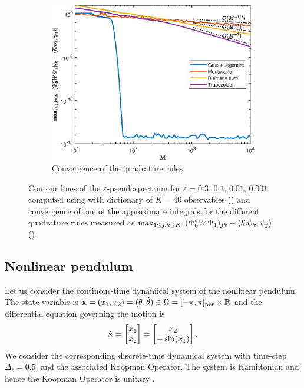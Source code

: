 \begin{figure}[h]
{\begin{subfigure}{0.45\textwidth}
        \includegraphics[width=\linewidth]{../code/figures/gauss_map/Galerkin_convergence.eps}
        \caption{Convergence of the quadrature rules}
        \label{gauss_convergence}
    \end{subfigure}\hspace*{\fill}
    }
    \caption{Contour lines of the $\varepsilon$-pseudospectrum for $\varepsilon = 0.3,\,0.1,\,0.01,\,0.001$ computed using  with dictionary of $K=40$ observables () and convergence of one of the approximate integrals for the different quadrature rules measured as $\max_{1\leq j,k \leq K} \abs{(\Psi_0^* W \Psi_1)_{jk} - \langle\mathcal{K}\psi_k, \psi_j\rangle}$ ().}
    \label{gauss_pseudospectrum_convergence}
\end{figure}

\subsection{Nonlinear pendulum}
Let us consider the continous-time dynamical system of the nonlinear pendulum. The state variable is $\vb{x} = (x_1, x_2) = (\theta, \dot{\theta}) \in \Omega = [-\pi, \pi]_{\text{per}} \times \mathbb{R}$ and the differential equation governing the motion is
\begin{equation}
    \label{pendulum_equation}
    \dot{\vb{x}} = 
    \begin{bmatrix}
    \dot{x}_1 \\
    \dot{x}_2
    \end{bmatrix} = 
    \begin{bmatrix}
    x_2 \\
    -\sin(x_1)
    \end{bmatrix}.
\end{equation}
We consider the corresponding discrete-time dynamical system with time-step $\Delta_t = 0.5.$ and the associated Koopman Operator. The system is Hamiltonian and hence the Koopman Operator is unitary \cite{koopman_hamiltonian_1931}.


